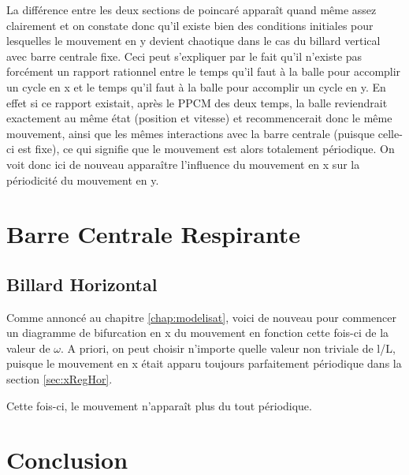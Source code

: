 \documentclass[a4paper]{report}
\begin{document}
La différence entre les deux sections de poincaré apparaît quand même assez clairement et on constate donc qu'il existe bien des conditions initiales pour lesquelles le mouvement en y devient chaotique dans le cas du billard vertical avec barre centrale fixe. Ceci peut s'expliquer par le fait qu'il n'existe pas forcément un rapport rationnel entre le temps qu'il faut à la balle pour accomplir un cycle en x et le temps qu'il faut à la balle pour accomplir un cycle en y. En effet si ce rapport existait, après le PPCM des deux temps, la balle reviendrait exactement au même état (position et vitesse) et recommencerait donc le même mouvement, ainsi que les mêmes interactions avec la barre centrale (puisque celle-ci est fixe), ce qui signifie que le mouvement est alors totalement périodique. On voit donc ici de nouveau apparaître l'influence du mouvement en x sur la périodicité du mouvement en y.

\chapter{Barre Centrale Respirante}

\section{Billard Horizontal}
Comme annoncé au chapitre \ref{chap:modelisat}, voici de nouveau pour commencer un diagramme de bifurcation en x du mouvement en fonction cette fois-ci de la valeur de \(\omega\). A priori, on peut choisir n'importe quelle valeur non triviale de l/L, puisque le mouvement en x était apparu toujours parfaitement périodique dans la section \ref{sec:xRegHor}.

Cette fois-ci, le mouvement n'apparaît plus du tout périodique.



\chapter{Conclusion}


%
%
\end{document}
